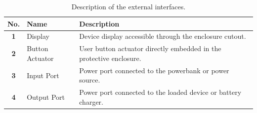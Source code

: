 \begin{table}[H]
    \centering
    \renewcommand{\arraystretch}{1.4}
    \caption{Description of the external interfaces.}
    \label{tab:user_interface}
    
    \begin{tabularx}{\textwidth}{|c|l|X|}
        \hline
        \textbf{No.} & \textbf{Name} & \textbf{Description} \\
        \hline

        \textbf{1} & Display & Device display accessible through the enclosure cutout. \\
        \hline

        \textbf{2} & Button Actuator & User button actuator directly embedded in the protective enclosure. \\
        \hline

        \textbf{3} & Input Port & Power port connected to the powerbank or power source. \\
        \hline

        \textbf{4} & Output Port & Power port connected to the loaded device or battery charger. \\
        \hline
        
    \end{tabularx}
\end{table}
